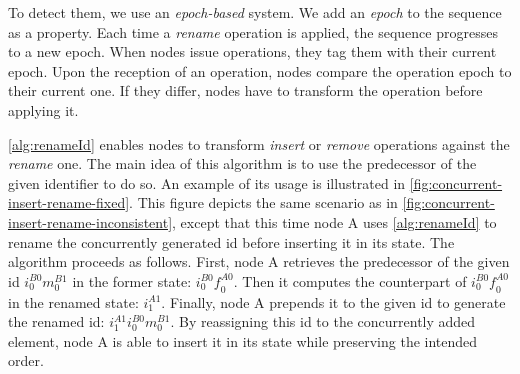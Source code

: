 \documentclass[10pt,journal,compsoc]{IEEEtran}
\newcommand{\trm}[1]{\mathit{#1}}
\newcommand{\id}[3]{$\trm{#1}^{\trm{#2}}_{\trm{#3}}$}
\begin{document}
To detect them, we use an \emph{epoch-based} system.
We add an \emph{epoch} to the sequence as a property.
Each time a \emph{rename} operation is applied, the sequence progresses to a new epoch.
When nodes issue operations, they tag them with their current epoch.
Upon the reception of an operation, nodes compare the operation epoch to their current one.
If they differ, nodes have to transform the operation before applying it.

\autoref{alg:renameId} enables nodes to transform \emph{insert} or \emph{remove} operations against the \emph{rename} one.
The main idea of this algorithm is to use the predecessor of the given identifier to do so.
An example of its usage is illustrated in \autoref{fig:concurrent-insert-rename-fixed}.
This figure depicts the same scenario as in \autoref{fig:concurrent-insert-rename-inconsistent}, except that this time node A uses \autoref{alg:renameId} to rename the concurrently generated id before inserting it in its state.
The algorithm proceeds as follows.
First, node A retrieves the predecessor of the given id \id{i}{B0}{0}\id{m}{B1}{0} in the former state: \id{i}{B0}{0}\id{f}{A0}{0}.
Then it computes the counterpart of \id{i}{B0}{0}\id{f}{A0}{0} in the renamed state: \id{i}{A1}{1}.
Finally, node A prepends it to the given id to generate the renamed id: \id{i}{A1}{1}\id{i}{B0}{0}\id{m}{B1}{0}.
By reassigning this id to the concurrently added element, node A is able to insert it in its state while preserving the intended order.
\end{document}
